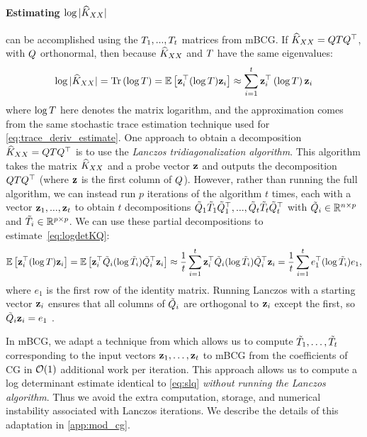 \paragraph{Estimating $\log \vert \widehat{K}_{XX} \vert$}
can be accomplished using the $T_{1},...,T_{t}$ matrices from mBCG. If $\widehat{K}_{XX}=QTQ^{\top}$, with $Q$ orthonormal, then because $\widehat{K}_{XX}$ and $T$ have the same eigenvalues:
\begin{equation}
  \log \vert \trainK \vert = \tr{\log \bT}  = \Ev{\bz_i^\top (\log \bT)\bz_i} \approx \sum_{i=1}^{t}\bz_{i}^\top \left( \log \bT \right) \bz_{i}\label{eq:logdetKQ}
\end{equation}
where $\log T$ here denotes the matrix logarithm, and the approximation comes from the same stochastic trace estimation technique used for \eqref{eq:trace_deriv_estimate}. One approach to obtain a decomposition $\widehat{K}_{XX}=QTQ^{\top}$ is to use the \emph{Lanczos tridiagonalization algorithm}. This algorithm takes the matrix $\widehat{K}_{XX}$ and a probe vector $\mathbf{z}$ and outputs the decomposition $QTQ^{\top}$ (where $\mathbf{z}$ is the first column of $Q$). However, rather than running the full algorithm, we can instead run $p$ iterations of the algorithm $t$ times, each with a vector $\mathbf{z}_{1},...,\mathbf{z}_{t}$ to obtain $t$ decompositions  $\tilde{Q}_{1}\tilde{T}_{1}\tilde{Q}_{1}^{\top},...,\tilde{Q}_{t}\tilde{T}_{t}\tilde{Q}_{t}^{\top}$ with $\tilde{Q}_{i} \in \mathbb{R}^{n \times p}$ and $\tilde{T}_{i} \in \mathbb{R}^{p \times p}$. We can use these partial decompositions to estimate~\eqref{eq:logdetKQ}:
\begin{equation}
  \operatorname*{\mathbb{E}} \left[ \mathbf{z}_i^\top (\log T)\mathbf{z}_i \right] = \operatorname*{\mathbb{E}} \left[ \mathbf{z}_i^\top  \tilde{Q}_{i}(\log \tilde{T}_{i}) \tilde{Q}_{i}^{\top}\mathbf{z}_{i} \right] \approx \frac{1}{t} \sum_{i=1}^{t} \mathbf{z}_i^{\top} \tilde{Q}_{i}(\log \tilde{T}_{i})\tilde{Q}_{i}^{\top}\mathbf{z}_{i} = \frac{1}{t} \sum_{i=1}^{t}e_{1}^{\top}(\log \tilde{T}_{i})e_{1},
  \label{eq:slq}
\end{equation}
where $e_{1}$ is the first row of the identity matrix. Running Lanczos with a starting vector $\mathbf{z}_{i}$ ensures that all columns of $\tilde{Q}_{i}$ are orthogonal to $\mathbf{z}_{i}$ except the first, so $\tilde{Q}_{i}\mathbf{z}_{i} = e_{1}$ \cite{dong2017scalable,ubaru2017fast,golub2009matrices}.

In mBCG, we adapt a technique from \citet{saad2003iterative} which allows us to compute $\tilde{T}_{1},\ldots,\tilde{T}_{t}$ corresponding to the input vectors $\mathbf{z}_{1},\ldots,\mathbf{z}_{t}$  to mBCG from the coefficients of CG in $\bigo{1}$ additional work per iteration.
This approach allows us to compute a log determinant estimate identical to \eqref{eq:slq} \emph{without running the Lanczos algorithm}.
Thus we avoid the extra computation, storage, and numerical instability associated with Lanczos iterations.
We describe the details of this adaptation in \cref{app:mod_cg}.

